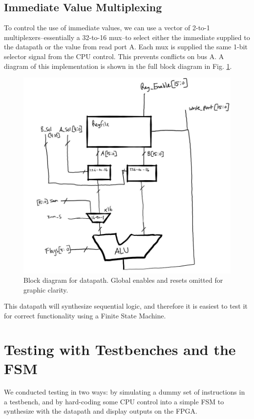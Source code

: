\documentclass[conference]{IEEEtran}
\begin{document}
\subsection{Immediate Value Multiplexing}
To control the use of immediate values, we can use a vector of 2-to-1 multiplexers--essentially a 32-to-16 mux--to select either the immediate supplied to the datapath or the value from read port A. Each mux is supplied the same 1-bit selector signal from the CPU control. This prevents conflicts on bus A. A diagram of this implementation is shown in the full block diagram in Fig. \ref{fig:datapath_block_diagram}.

\begin{figure}[h]
    \centering
    \includegraphics[scale=0.45]{lab_2_figures/block_diagram_datapath.JPG}
    \caption{Block diagram for datapath. Global enables and resets omitted for graphic clarity.}
    \label{fig:datapath_block_diagram}
\end{figure}

This datapath will synthesize sequential logic, and therefore it is easiest to test it for correct functionality using a Finite State Machine.

\section{Testing with Testbenches and the FSM}
We conducted testing in two ways: by simulating a dummy set of instructions in a testbench, and by hard-coding some CPU control into a simple FSM to synthesize with the datapath and display outputs on the FPGA.
\end{document}
